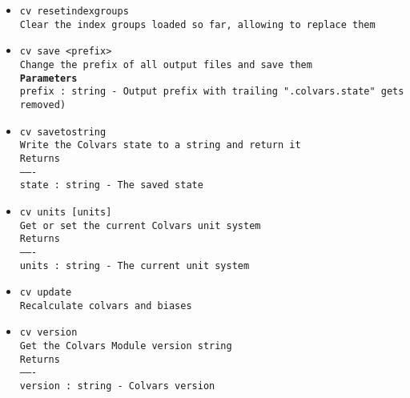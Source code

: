 \begin{itemize}
\item \texttt{cv resetindexgroups}
\\
\texttt{Clear the index groups loaded so far, allowing to replace them}
\item \texttt{cv save <prefix>}
\\
\texttt{Change the prefix of all output files and save them}
\\
\texttt{\textbf{Parameters}}
\\
\texttt{prefix : string - Output prefix with trailing ".colvars.state" gets removed)}
\item \texttt{cv savetostring}
\\
\texttt{Write the Colvars state to a string and return it}
\\
\texttt{Returns}
\\
\texttt{-------}
\\
\texttt{state : string - The saved state}
\item \texttt{cv units [units]}
\\
\texttt{Get or set the current Colvars unit system}
\\
\texttt{Returns}
\\
\texttt{-------}
\\
\texttt{units : string - The current unit system}
\item \texttt{cv update}
\\
\texttt{Recalculate colvars and biases}
\item \texttt{cv version}
\\
\texttt{Get the Colvars Module version string}
\\
\texttt{Returns}
\\
\texttt{-------}
\\
\texttt{version : string - Colvars version}
\end{itemize}
